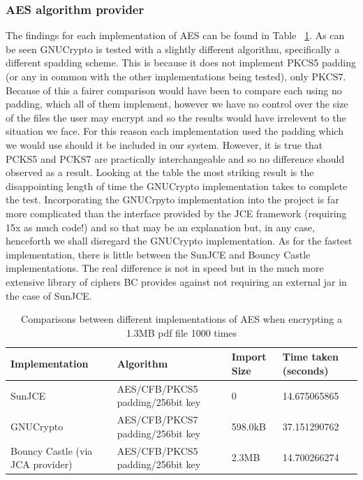 \documentclass[12pt, titlepage]{article}
\begin{document}
\subsubsection{AES algorithm provider}
The findings for each implementation of AES can be found in Table ~\ref{tab:aesComparison}. As can be seen GNUCrypto is tested with a slightly different algorithm, specifically a different spadding scheme. This is because it does not implement PKCS5 padding (or any in common with the other implementations being tested), only PKCS7. Because of this a fairer comparison would have been to compare each using no padding, which all of them implement, however we have no control over the size of the files the user may encrypt and so the results would have irrelevent to the situation we face. For this reason each implementation used the padding which we would use should it be included in our system. However, it is true that PCKS5 and PCKS7 are practically interchangeable and so no difference should observed as a result.
\newline Looking at the table the most striking result is the disappointing length of time the GNUCrypto implementation takes to complete the test. Incorporating the GNUCrpyto implementation into the project is far more complicated than the interface provided by the JCE framework (requiring 15x as much code!) and so that may be an explanation but, in any case, henceforth we shall disregard the GNUCrypto implementation. As for the fastest implementation, there is little between the SunJCE and Bouncy Castle implementations. The real difference is not in speed but in the much more extensive library of ciphers BC provides against not requiring an external jar in the case of SunJCE.

\begin{center}
\begin{table}
    \begin{tabular}{ | l | l | l | l |}
    \hline
    Implementation & Algorithm & Import Size & Time taken (seconds) \\ \hline
    
    SunJCE & AES/CFB/PKCS5 padding/256bit key & 0 & 14.675065865 \\ \hline
    
    GNUCrypto & AES/CFB/PKCS7 padding/256bit key & 598.0kB & 37.151290762 \\ \hline
    
     Bouncy Castle (via JCA provider) & AES/CFB/PKCS5 padding/256bit key & 2.3MB & 14.700266274 \\ \hline
    
    \end{tabular}
    \caption{Comparisons between different implementations of AES when encrypting a 1.3MB pdf file 1000 times} \label{tab:aesComparison}
    \end{table}
\end{center}
\end{document}
